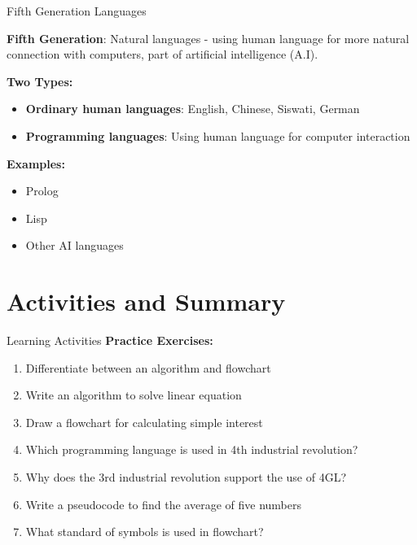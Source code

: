 \documentclass[aspectratio=169]{beamer}
\begin{document}
\begin{frame}{Fifth Generation Languages}
    \begin{definition}
        \textbf{Fifth Generation}: Natural languages - using human language for more natural connection with computers, part of artificial intelligence (A.I).
    \end{definition}
    
    \vspace{0.3cm}
    \textbf{Two Types:}
    \begin{itemize}
        \item \textbf{Ordinary human languages}: English, Chinese, Siswati, German
        \item \textbf{Programming languages}: Using human language for computer interaction
    \end{itemize}
    
    \vspace{0.3cm}
    \textbf{Examples:}
    \begin{itemize}
        \item Prolog
        \item Lisp
        \item Other AI languages
    \end{itemize}
\end{frame}

\section{Activities and Summary}

\begin{frame}{Learning Activities}
    \textbf{Practice Exercises:}
    
    \begin{enumerate}
        \item Differentiate between an algorithm and flowchart
        \item Write an algorithm to solve linear equation
        \item Draw a flowchart for calculating simple interest
        \item Which programming language is used in 4th industrial revolution?
        \item Why does the 3rd industrial revolution support the use of 4GL?
        \item Write a pseudocode to find the average of five numbers
        \item What standard of symbols is used in flowchart?
    \end{enumerate}
\end{frame}
\end{document}
